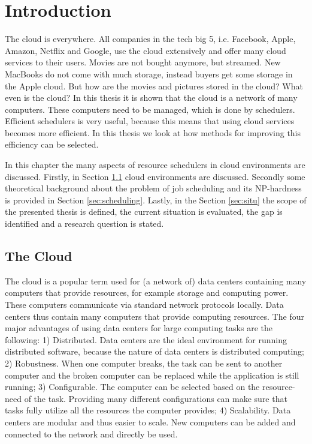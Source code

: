 \chapter{Introduction}\label{sec:intro}

The cloud is everywhere. All companies in the tech big 5, i.e. Facebook,
Apple, Amazon, Netflix and Google, use the cloud extensively and offer many cloud
services to their users. Movies are not bought anymore, but streamed. New
MacBooks do not come with much storage, instead buyers get some storage in the
Apple cloud. But how are the movies and pictures stored in the cloud? What
even is the cloud? In this thesis it is shown that the cloud is a network of
many computers. These computers need to be managed, which is done by
schedulers. Efficient schedulers is very useful, because this means that using
cloud services becomes more efficient. In this thesis we look at how methods
for improving this efficiency can be selected.

In this chapter the many aspects of resource schedulers in cloud environments
are discussed. Firstly, in Section \ref{sec:cloud} cloud environments are
discussed. Secondly some theoretical background about the problem of job
scheduling and its NP-hardness is provided in Section \ref{sec:scheduling}.
Lastly, in the Section \ref{sec:situ} the scope of the presented thesis is
defined, the current situation is evaluated, the gap is identified and a
research question is stated.

\section{The Cloud}\label{sec:cloud}

The cloud is a popular term used for (a network of) data centers containing
many computers that provide resources, for example storage and computing
power. These computers communicate via standard network protocols locally.
Data centers thus contain many computers that provide computing resources. The
four major advantages of using data centers for large computing tasks are the
following: 1) Distributed. Data centers are the ideal environment for running
distributed software, because the nature of data centers is distributed
computing; 2) Robustness. When one computer breaks, the task can be sent to
another computer and the broken computer can be replaced while the application
is still running; 3) Configurable. The computer can be selected based on the
resource-need of the task. Providing many different configurations can make
sure that tasks fully utilize all the resources the computer provides; 4)
Scalability. Data centers are modular and thus easier to scale. New computers
can be added and connected to the network and directly be used.

